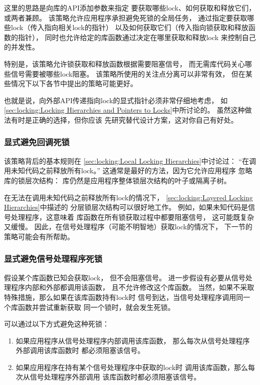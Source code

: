 这里的思路是向库的API添加参数来指定
要获取哪些lock、如何获取和释放它们，或两者兼顾。
该策略允许应用程序承担避免死锁的全局任务，
通过指定要获取哪些lock（传入指向相关lock的指针）
以及如何获取它们（传入指向锁获取和释放函数的指针），
同时也允许给定的库函数通过决定在哪里获取和释放lock
来控制自己的并发性。

特别是，该策略允许锁获取和释放函数根据需要阻塞信号，
而无需库代码关心哪些信号需要被哪些lock阻塞。
该策略所使用的关注点分离可以非常有效，
但在某些情况下以下各节中提出的策略可能更好。

也就是说，向外部API传递指向lock的显式指针必须非常仔细地考虑，
如\cref{sec:locking:Locking Hierarchies and Pointers to Locks}中所讨论的。
虽然这种做法有时是正确的选择，但你应该
先研究替代设计方案，这对你自己有好处。

\subsubsection{显式避免回调死锁}
\label{sec:locking:Explicitly Avoid Callback Deadlocks}

该策略背后的基本规则在
\cref{sec:locking:Local Locking Hierarchies}中讨论过：
``在调用未知代码之前释放所有lock。''
这通常是最好的方法，因为它允许应用程序
忽略库的锁层次结构：
库仍然是应用程序整体锁层次结构的叶子或隔离子树。

在无法在调用未知代码之前释放所有lock的情况下，
\cref{sec:locking:Layered Locking Hierarchies}中描述的
分层锁层次结构可以很好地工作。
例如，如果未知代码是信号处理程序，这意味着
库函数在所有锁获取过程中都要阻塞信号，
这可能既复杂又缓慢。
因此，在信号处理程序（可能不明智地）获取lock的情况下，
下一节的策略可能会有所帮助。

\subsubsection{显式避免信号处理程序死锁}
\label{sec:locking:Explicitly Avoid Signal-Handler Deadlocks}

假设某个库函数已知会获取lock，
但不会阻塞信号。
进一步假设有必要从信号处理程序内部和外部都调用该函数，
且不允许修改这个库函数。
当然，如果不采取特殊措施，那么如果在该库函数持有lock时
信号到达，当信号处理程序调用同一个库函数并尝试重新获取
同一个锁时，就会发生死锁。

可以通过以下方式避免这种死锁：

\begin{enumerate}
\item	如果应用程序从信号处理程序内部调用该库函数，
	那么每次从信号处理程序外部调用该库函数时
	都必须阻塞该信号。
\item	如果应用程序在持有某个信号处理程序中获取的lock时
	调用该库函数，那么每次从信号处理程序外部调用
	该库函数时都必须阻塞该信号。
\end{enumerate}

